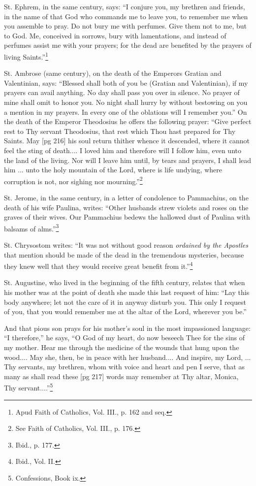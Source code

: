 St. Ephrem, in the same century, says: “I conjure
you, my brethren and friends, in the name
of that God who commands me to leave you, to
remember me when you assemble to pray. Do
not bury me with perfumes. Give them not to
me, but to God. Me, conceived in sorrows, bury
with lamentations, and instead of perfumes assist
me with your prayers; for the dead are benefited
by the prayers of living Saints.”\footnote{Apud
Faith of Catholics, Vol. III., p. 162 and seq.}

St. Ambrose (same century), on the death of
the Emperors Gratian and Valentinian, says:
“Blessed shall both of you be (Gratian and Valentinian),
if my prayers can avail anything. No
day shall pass you over in silence. No prayer
of mine shall omit to honor you. No night shall
hurry by without bestowing on you a mention in
my prayers. In every one of the oblations will
I remember you.” On the death of the Emperor
Theodosius he offers the following prayer: “Give
perfect rest to Thy servant Theodosius, that rest
which Thou hast prepared for Thy Saints. May
[pg 216]
his soul return thither whence it descended, where
it cannot feel the sting of death.... I loved him
and therefore will I follow him, even unto the land
of the living. Nor will I leave him until, by tears
and prayers, I shall lead him ... unto the holy
mountain of the Lord, where is life undying, where
corruption is not, nor sighing nor mourning.”\footnote{See
Faith of Catholics, Vol. III., p. 176.}

St. Jerome, in the same century, in a letter of
condolence to Pammachius, on the death of his
wife Paulina, writes: “Other husbands strew violets
and roses on the graves of their wives. Our
Pammachius bedews the hallowed dust of Paulina
with balsams of alms.”\footnote{Ibid., p. 177.}

St. Chrysostom writes: “It was not without
good reason \emph{ordained by the Apostles} that mention
should be made of the dead in the tremendous
mysteries, because they knew well that they
would receive great benefit from it.”\footnote{Ibid., Vol. II.}

St. Augustine, who lived in the beginning of
the fifth century, relates that when his mother
was at the point of death she made this last request
of him: “Lay this body anywhere; let not
the care of it in anyway disturb you. This only
I request of you, that you would remember me
at the altar of the Lord, wherever you be.”

And that pious son prays for his mother's soul
in the most impassioned language: “I therefore,”
he says, “O God of my heart, do now beseech
Thee for the sins of my mother. Hear me through
the medicine of the wounds that hung upon the
wood.... May she, then, be in peace with her
husband.... And inspire, my Lord, ... Thy
servants, my brethren, whom with voice and heart
and pen I serve, that as many as shall read these
[pg 217]
words may remember at Thy altar, Monica, Thy
servant....”\footnote{Confessions, Book ix.}

